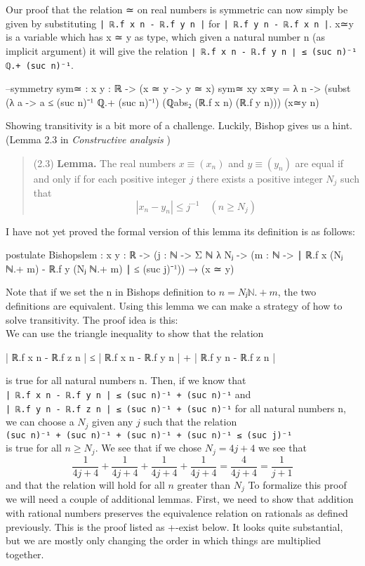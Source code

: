 \documentclass[11pt,a4paper]{article}
\begin{document}
Our proof that the relation ≃ on real numbers is symmetric can now simply be given by substituting \texttt{| ℝ.f x n - ℝ.f y n |} for \texttt{| ℝ.f y n - ℝ.f x n |}. x≃y is a variable which has x ≃ y as type, which given a natural number n (as implicit argument) it will give the relation \texttt{∣ ℝ.f x n - ℝ.f y n ∣ ≤ (suc n)⁻¹ ℚ.+ (suc n)⁻¹}.
\begin{code}
  --symmetry
  sym≃ : {x y : ℝ} -> (x ≃ y -> y ≃ x)
  sym≃ {x}{y} x≃y = λ {n} -> (subst (λ a -> a ≤ (suc n)⁻¹ ℚ.+ (suc n)⁻¹) (ℚabs₂ (ℝ.f x n) (ℝ.f y n))) (x≃y {n})
\end{code}
Showing transitivity is a bit more of a challenge. Luckily, Bishop gives us a hint. (Lemma 2.3 in \textit{Constructive analysis} \cite{bishop:85})
\blockquote{
(2.3) \textbf{Lemma.} The real numbers $x\equiv(x_n)$ and $y\equiv(y_n)$ are equal if and only if for each positive integer $j$ there exists a positive integer $N_j$ such that
$$|x_n - y_n| \leq j^{-1} \quad (n \geq N_j)$$
}
I have not yet proved the formal version of this lemma its definition is as follows:
\begin{code}
postulate Bishopslem : {x y : ℝ} -> ({j : ℕ} -> Σ ℕ λ Nⱼ -> ({m : ℕ} -> ∣ ℝ.f x (Nⱼ ℕ.+ m) - ℝ.f y (Nⱼ ℕ.+ m) ∣ ≤ (suc j)⁻¹)) → (x ≃ y)
\end{code}
Note that if we set the n in Bishops definition to $n = Nⱼ ℕ.+ m$, the two definitions are equivalent.
Using this lemma we can make a strategy of how to solve transitivity. The proof idea is this:\\
We can use the triangle inequality to show that the relation
\begin{code}
| ℝ.f x n - ℝ.f z n | ≤ 
| ℝ.f x n - ℝ.f y n | + | ℝ.f y n - ℝ.f z n |
\end{code} 
is true for all natural numbers n. Then, if we know that \\
\texttt{| ℝ.f x n - ℝ.f y n | ≤ (suc n)⁻¹ + (suc n)⁻¹} and \\
\texttt{| ℝ.f y n - ℝ.f z n | ≤ (suc n)⁻¹ + (suc n)⁻¹} for all natural numbers n, we can choose a $N_j$ given any $j$ such that the relation\\
\texttt{(suc n)⁻¹ + (suc n)⁻¹ + (suc n)⁻¹ + (suc n)⁻¹ ≤ (suc j)⁻¹}\\
is true for all $n \geq N_j$. We see that if we chose $N_j = 4j + 4$ we see that
$$\frac{1}{4j + 4}+\frac{1}{4j + 4}+\frac{1}{4j + 4}+\frac{1}{4j + 4}=\frac{4}{4j+4}=\frac{1}{j + 1}$$ and that the relation will hold for all $n$ greater than $N_j$
To formalize this proof we will need a couple of additional lemmas. First, we need to show that addition with rational numbers preserves the equivalence relation on rationals as defined previously. This is the proof listed as +-exist below. It looks quite substantial, but we are mostly only changing the order in which things are multiplied together.
\end{document}
